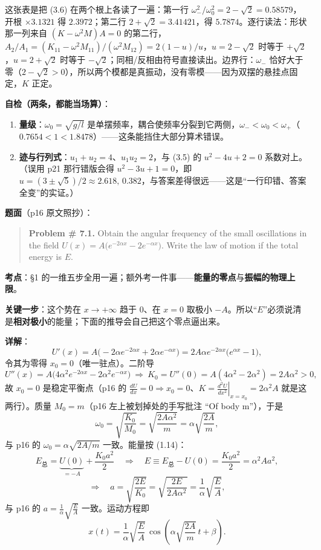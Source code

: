 \documentclass[11pt]{ctexart}
\begin{document}
这张表是把 (3.6) 在两个根上各读了一遍：第一行 $\omega_-^2/\omega_0^2=2-\sqrt2=0.58579$，开根 $\times3.1321$ 得 $2.3972$；第二行 $2+\sqrt2=3.41421$，得 $5.7874$。逐行读法：形状那一列来自 $(K-\omega^2M)A=0$ 的第二行，$A_2/A_1=(K_{11}-\omega^2M_{11})/(\omega^2M_{12})=2(1-u)/u$，$u=2-\sqrt2$ 时等于 $+\sqrt2$，$u=2+\sqrt2$ 时等于 $-\sqrt2$；同相/反相由符号直接读出。边界行：$\omega_-$ 恰好大于零（$2-\sqrt2>0$），所以两个模都是真振动，没有零模——因为双摆的悬挂点固定，$K$ 正定。

\textbf{自检（两条，都能当场算）}：
\begin{enumerate}
\item \textbf{量级}：$\omega_0=\sqrt{g/l}$ 是单摆频率，耦合使频率分裂到它两侧，$\omega_-<\omega_0<\omega_+$（$0.7654<1<1.8478$）——这条能挡住大部分算术错误。
\item \textbf{迹与行列式}：$u_1+u_2=4$、$u_1u_2=2$，与 (3.5) 的 $u^2-4u+2=0$ 系数对上。（误用 p21 那行错版会得 $u^2-3u+1=0$，即 $u=(3\pm\sqrt5)/2\approx2.618,\,0.382$，与答案差得很远——这是“一行印错、答案全变”的实证。）
\end{enumerate}



\textbf{题面}（p16 原文照抄）：
\begin{quote}
\small
\textbf{Problem \# 7.1.} Obtain the angular frequency of the small oscillations in the field $U(x)=A\bigl(e^{-2\alpha x}-2e^{-\alpha x}\bigr)$. Write the law of motion if the total energy is $E$.
\end{quote}

\textbf{考点}：§1 的一维五步全用一遍；额外考一件事——\textbf{能量的零点}与\textbf{振幅的物理上限}。

\textbf{关键一步}：这个势在 $x\to+\infty$ 趋于 $0$、在 $x=0$ 取极小 $-A$。所以“$E$”必须说清是\textbf{相对极小}的能量；下面的推导会自己把这个零点逼出来。

\textbf{详解}：
\[
U'(x)=A\bigl(-2\alpha e^{-2\alpha x}+2\alpha e^{-\alpha x}\bigr)=2A\alpha e^{-2\alpha x}\bigl(e^{\alpha x}-1\bigr),
\]
令其为零得 $x_0=0$（唯一驻点）。二阶导
\[
U''(x)=A\bigl(4\alpha^2e^{-2\alpha x}-2\alpha^2e^{-\alpha x}\bigr)
\ \Longrightarrow\
K_0=U''(0)=A(4\alpha^2-2\alpha^2)=2A\alpha^2>0 ,
\]
故 $x_0=0$ 是稳定平衡点（p16 的 $\frac{dU}{dx}=0\Rightarrow x_0=0$、$K=\left.\frac{d^2U}{dx^2}\right|_{x=x_0}=2\alpha^2A$ 就是这两行）。质量 $M_0=m$（p16 左上被划掉处的手写批注 “Of body m”），于是
\[
\omega_0=\sqrt{\frac{K_0}{M_0}}=\sqrt{\frac{2A\alpha^2}{m}}=\alpha\sqrt{\frac{2A}{m}} ,
\tag{4.1}
\]
与 p16 的 $\omega_0=\alpha\sqrt{2A/m}$ 一致。能量按 (1.14)：
\[
E_{\text{总}}=\underbrace{U(0)}_{=-A}+\frac{K_0a^2}{2}\quad\Longrightarrow\quad E\equiv E_{\text{总}}-U(0)=\frac{K_0a^2}{2}=\alpha^2Aa^2 ,
\]
\[
\Longrightarrow\quad a=\sqrt{\frac{2E}{K_0}}=\sqrt{\frac{2E}{2A\alpha^2}}=\frac{1}{\alpha}\sqrt{\frac{E}{A}} ,
\tag{4.2}
\]
与 p16 的 $a=\frac{1}{\alpha}\sqrt{\frac EA}$ 一致。运动方程即
\[
x(t)=\frac{1}{\alpha}\sqrt{\frac{E}{A}}\,\cos\!\left(\alpha\sqrt{\frac{2A}{m}}\,t+\beta\right).
\tag{4.3}
\]
\end{document}
